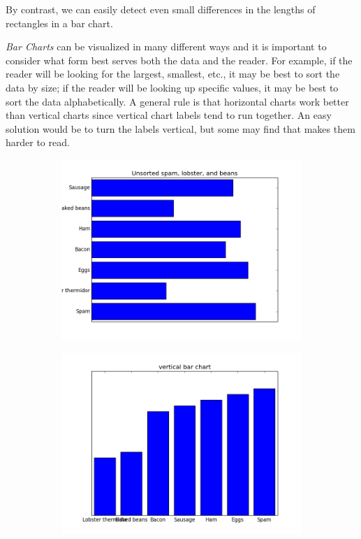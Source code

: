 By contrast, we can easily detect even small differences in the lengths of rectangles in a bar chart. 

\emph{Bar Charts} can be visualized in many different ways and it is important to consider what form best serves both the data and the reader. For example, if the reader will be looking for the largest, smallest, etc., it may be best to sort the data by size; if the reader will be looking up specific values, it may be best to sort the data alphabetically. A general rule is that horizontal charts work better than vertical charts since vertical chart labels tend to run together. An easy solution would be to turn the labels vertical, but some may find that makes them harder to read.

\begin{figure}
\centering
\begin{subfigure}{.2\textwidth}
  \centering
  \includegraphics[width=\textwidth]{bar_chart_unsorted.png}
\end{subfigure}%
\begin{subfigure}{.2\textwidth}
  \centering
  \includegraphics[width=\textwidth]{bar_chart_vertical.png}

\end{subfigure}
\end{figure}
